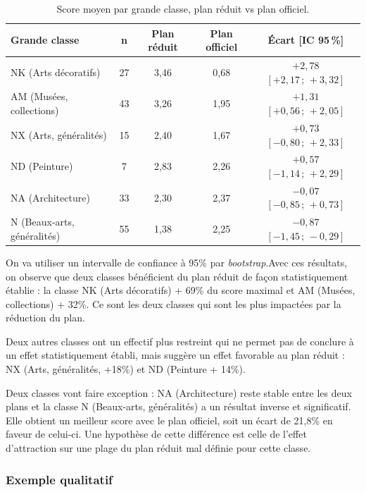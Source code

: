 \begin{table}[h]
\centering
\begin{tabular}{lcccc}
\toprule
\textbf{Grande classe} & \textbf{n} & \textbf{Plan réduit} &
\textbf{Plan officiel} & \textbf{Écart [IC 95\,\%]} \\
\midrule
NK (Arts décoratifs)          & 27 & 3,46 & 0,68 & $+2{,}78$ $[+2{,}17\,;\,+3{,}32]$ \\
AM (Musées, collections)      & 43 & 3,26 & 1,95 & $+1{,}31$ $[+0{,}56\,;\,+2{,}05]$ \\
NX (Arts, généralités)        & 15 & 2,40 & 1,67 & $+0{,}73$ $[-0{,}80\,;\,+2{,}33]$ \\
ND (Peinture)                 &  7 & 2,83 & 2,26 & $+0{,}57$ $[-1{,}14\,;\,+2{,}29]$ \\
NA (Architecture)             & 33 & 2,30 & 2,37 & $-0{,}07$ $[-0{,}85\,;\,+0{,}73]$ \\
N  (Beaux-arts, généralités)  & 55 & 1,38 & 2,25 & $-0{,}87$ $[-1{,}45\,;\,-0{,}29]$ \\
\bottomrule
\end{tabular}
\caption{Score moyen par grande classe, plan réduit vs plan officiel.}
\label{tab:plan-par-classe}
\end{table}

On va utiliser un intervalle de confiance à 95\% par \textit{bootstrap}.Avec ces résultats, on observe que deux classes bénéficient du plan réduit de façon statistiquement établie : la classe NK (Arts décoratifs) + 69\% du score maximal et AM (Musées, collections) + 32\%. Ce sont les deux classes qui sont les plus impactées par la réduction du plan.

Deux autres classes ont un effectif plus restreint qui ne permet pas de conclure à un effet statistiquement établi, mais suggère un effet favorable au plan réduit : NX (Arts, généralités, +18\%) et ND (Peinture + 14\%).

Deux classes vont faire exception : NA (Architecture) reste stable entre les deux plans et la classe N (Beaux-arts, généralités) a un résultat inverse et significatif. Elle obtient un meilleur score avec le plan officiel, soit un écart de 21,8\% en faveur de celui-ci.
Une hypothèse de cette différence est celle de l'effet d'attraction sur une plage du plan réduit mal définie pour cette classe.

\subsubsection*{Exemple qualitatif}

